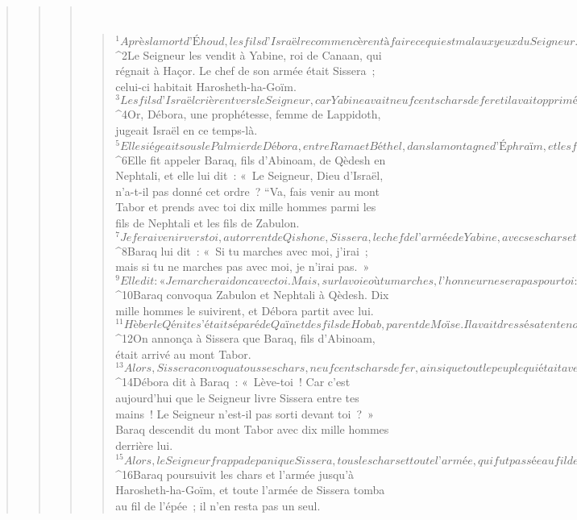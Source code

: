 \begin{verse}
\begin{verse}
\begin{verse}
         
      \bchapter{}
      \begin{verse}
${}^{1}Après la mort d’Éhoud, les fils d’Israël recommencèrent à faire ce qui est mal aux yeux du Seigneur. 
${}^{2}Le Seigneur les vendit à Yabine, roi de Canaan, qui régnait à Haçor. Le chef de son armée était Sissera ; celui-ci habitait Harosheth-ha-Goïm. 
${}^{3}Les fils d’Israël crièrent vers le Seigneur, car Yabine avait neuf cents chars de fer et il avait opprimé durement les fils d’Israël pendant vingt ans.
${}^{4}Or, Débora, une prophétesse, femme de Lappidoth, jugeait Israël en ce temps-là. 
${}^{5}Elle siégeait sous le Palmier de Débora, entre Rama et Béthel, dans la montagne d’Éphraïm, et les fils d’Israël venaient vers elle pour faire arbitrer leurs litiges.
${}^{6}Elle fit appeler Baraq, fils d’Abinoam, de Qèdesh en Nephtali, et elle lui dit : « Le Seigneur, Dieu d’Israël, n’a-t-il pas donné cet ordre ? “Va, fais venir au mont Tabor et prends avec toi dix mille hommes parmi les fils de Nephtali et les fils de Zabulon. 
${}^{7}Je ferai venir vers toi, au torrent de Qishone, Sissera, le chef de l’armée de Yabine, avec ses chars et ses troupes, et je le livrerai entre tes mains.” » 
${}^{8}Baraq lui dit : « Si tu marches avec moi, j’irai ; mais si tu ne marches pas avec moi, je n’irai pas. » 
${}^{9}Elle dit : « Je marcherai donc avec toi. Mais, sur la voie où tu marches, l’honneur ne sera pas pour toi : car c’est à une femme que le Seigneur abandonnera Sissera. » Débora se leva et se rendit avec Baraq à Qèdesh. 
${}^{10}Baraq convoqua Zabulon et Nephtali à Qèdesh. Dix mille hommes le suivirent, et Débora partit avec lui.
${}^{11}Hèber le Qénite s’était séparé de Qaïn et des fils de Hobab, parent de Moïse. Il avait dressé sa tente non loin du chêne de Saanaïm, près de Qèdesh.
${}^{12}On annonça à Sissera que Baraq, fils d’Abinoam, était arrivé au mont Tabor. 
${}^{13}Alors, Sissera convoqua tous ses chars, neuf cents chars de fer, ainsi que tout le peuple qui était avec lui, depuis Harosheth-ha-Goïm jusqu’au torrent de Qishone. 
${}^{14}Débora dit à Baraq : « Lève-toi ! Car c’est aujourd’hui que le Seigneur livre Sissera entre tes mains ! Le Seigneur n’est-il pas sorti devant toi ? » Baraq descendit du mont Tabor avec dix mille hommes derrière lui. 
${}^{15}Alors, le Seigneur frappa de panique Sissera, tous les chars et toute l’armée, qui fut passée au fil de l’épée devant Baraq. Sissera descendit de son char et s’enfuit à pied. 
${}^{16}Baraq poursuivit les chars et l’armée jusqu’à Harosheth-ha-Goïm, et toute l’armée de Sissera tomba au fil de l’épée ; il n’en resta pas un seul.

\end{verse}
\end{verse}
\end{verse}
\end{verse}
